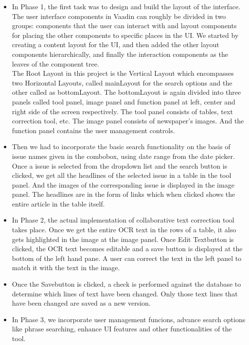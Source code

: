 \documentclass[amsart, 12pt]{article}
\begin{document}
\begin{itemize}
    \item In Phase 1, the first task was to design and build the layout of the interface. The user interface components in Vaadin can roughly be divided in two groups: components that the user can interact with and layout components for placing the other components to specific places in the UI. We started by creating a content layout for the UI, and then added the other layout components hierarchically, and finally the interaction components as the leaves of the component tree.\\
The Root Layout in this project is the Vertical Layout which encompasses two Horizontal Layouts, called mainLayout for the search options and the other called as bottomLayout. The bottomLayout is again divided into three panels called tool panel, image panel and function panel at left, center and right side of the screen respectively. The tool panel consists of tables, text correction tool, etc. The image panel consists of newspaper's images. And the function panel contains the user management controls.

\item Then we had to incorporate the basic search functionality on the basis of issue names given in the combobox, using date range from the date picker.
Once a issue is selected from the dropdown list and the search button is clicked, we get all the headlines of the selected issue in a table in the tool panel. And the images of the corresponding issue is displayed in the image panel. The headlines are in the form of links which when clicked shows the entire article in the table itself.
\item In Phase 2, the actual implementation of collaborative text correction tool takes place. Once we get the entire OCR text in the rows of a table, it also gets highlighted in the image at the image panel. Once \textgravedbl Edit Text\textacutedbl button is clicked, the OCR text becomes editable and a save button is displayed at the bottom of the left hand pane. A user can correct the text in the left panel to match it with the text in the image. 
\item Once the \textgravedbl Save\textacutedbl button is clicked, a check is performed against the database to determine which lines of text have been changed.  Only those text lines that have been changed are saved as a new version.
\item In Phase 3, we incorporate user management funcions, advance search options like phrase searching, enhance UI features and other functionalities of the tool.
\end{itemize}
\end{document}
